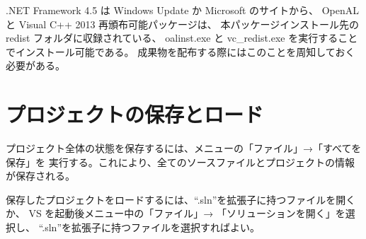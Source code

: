 \documentclass[a4j]{jarticle}
\begin{document}
.NET Framework 4.5 は Windows Update か Microsoft のサイトから、
OpenAL と Visual C++ 2013 再頒布可能パッケージは、
本パッケージインストール先の redist フォルダに収録されている、
oalinst.exe と vc_redist.exe を実行することでインストール可能である。
成果物を配布する際にはこのことを周知しておく必要がある。

\section{プロジェクトの保存とロード}
プロジェクト全体の状態を保存するには、メニューの「ファイル」→「すべてを保存」を
実行する。これにより、全てのソースファイルとプロジェクトの情報が保存される。

保存したプロジェクトをロードするには、``.sln''を拡張子に持つファイルを開くか、
VS を起動後メニュー中の「ファイル」→ 「ソリューションを開く」を選択し、
``.sln''を拡張子に持つファイルを選択すればよい。
\end{document}
